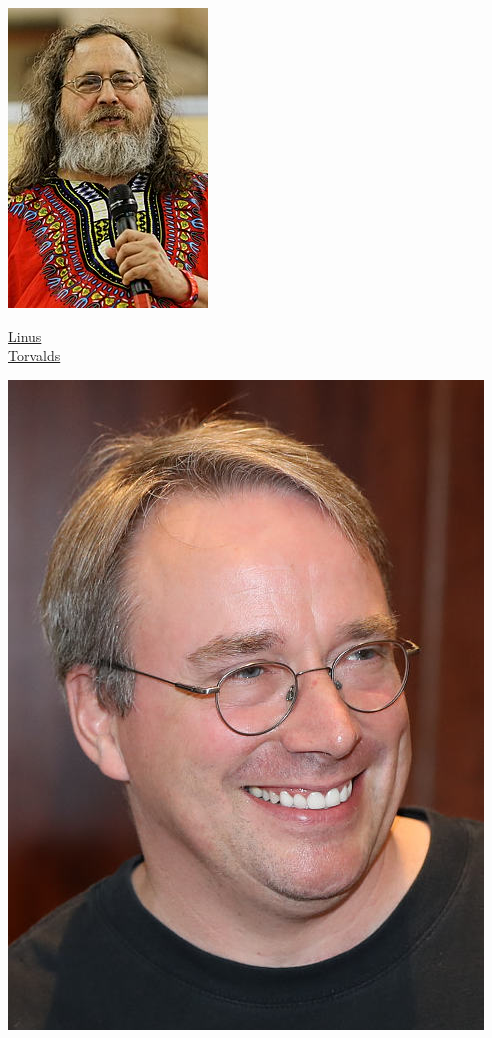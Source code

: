 \begin{multicols}{3}
\begin{center}
		\includegraphics[width=.7\columnwidth]{./IMG-GIT/rms.jpg}
	\end{center}

\vfill
\columnbreak

\begin{center}
	\href{https://pt.wikipedia.org/wiki/Linus_Torvalds}{Linus \\Torvalds}
	
	\includegraphics[width=.8\columnwidth]{./IMG-GIT/linus.jpeg}
\end{center}


\end{multicols}
